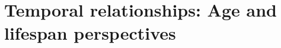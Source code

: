 \documentclass{article}
\begin{document}
\section*{Temporal relationships: Age and lifespan perspectives}

\end{document}
